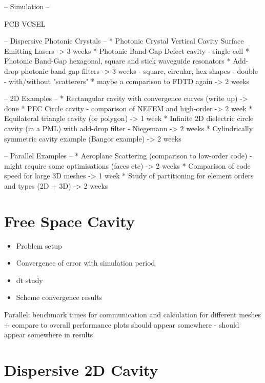 
-- Simulation  --

PCB VCSEL

-- Dispersive Photonic Crystals --
* Photonic Crystal Vertical Cavity Surface Emitting Lasers -> 3 weeks
  * Photonic Band-Gap Defect cavity - single cell
  * Photonic Band-Gap hexagonal, square and stick waveguide resonators
* Add-drop photonic band gap filters  -> 3 weeks
  - square, circular, hex shapes
  - double
  - with/without "scatterers"
* maybe a comparison to FDTD again -> 2 weeks

-- 2D Examples --
* Rectangular cavity with convergence curves (write up) -> done
* PEC Circle cavity - comparison of NEFEM and high-order -> 2 week
* Equilateral triangle cavity (or polygon) -> 1 week
* Infinite 2D dielectric circle cavity (in a PML) with add-drop filter - Niegemann -> 2 weeks
* Cylindrically symmetric cavity example (Bangor example) -> 2 weeks
 
-- Parallel Examples --
* Aeroplane Scattering (comparison to low-order code) - might require some optimisations (faces etc) -> 2 weeks
* Comparison of code speed for large 3D meshes -> 1 week
* Study of partitioning for element orders and types (2D + 3D) -> 2 weeks


\chapter{Free Space Cavity} %
\label{Chapter3}

\begin{itemize}
	\item Problem setup
  \item Convergence of error with simulation period
  \item dt study
  \item Scheme convergence results
\end{itemize}

Parallel: benchmark times for communication and calculation for different meshes + compare to overall performance plots should appear somewhere - should appear somewhere in results.


\chapter{Dispersive 2D Cavity} %
\label{Chapter3}

